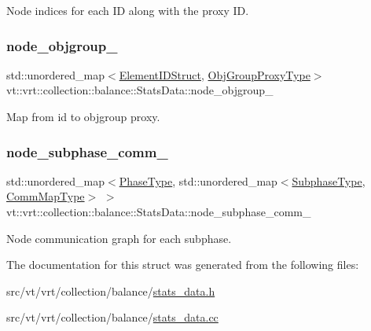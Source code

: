 Node indices for each ID along with the proxy ID. 

\mbox{\label{structvt_1_1vrt_1_1collection_1_1balance_1_1_stats_data_a1c281f52e1256426885206aa38f85670}} 
\subsubsection{\texorpdfstring{node\+\_\+objgroup\+\_\+}{node\_objgroup\_}}
{\footnotesize\ttfamily std\+::unordered\+\_\+map$<$\hyperlink{namespacevt_1_1vrt_1_1collection_1_1balance_a9f5b53fafb270212279a4757d2c4cd28}{Element\+I\+D\+Struct}, \hyperlink{namespacevt_ad7cae989df485fccca57f0792a880a8e}{Obj\+Group\+Proxy\+Type}$>$ vt\+::vrt\+::collection\+::balance\+::\+Stats\+Data\+::node\+\_\+objgroup\+\_\+}



Map from id to objgroup proxy. 

\mbox{\label{structvt_1_1vrt_1_1collection_1_1balance_1_1_stats_data_ac78802ff554a4d802a163afa5756412e}} 
\subsubsection{\texorpdfstring{node\+\_\+subphase\+\_\+comm\+\_\+}{node\_subphase\_comm\_}}
{\footnotesize\ttfamily std\+::unordered\+\_\+map$<$\hyperlink{namespacevt_a46ce6733d5cdbd735d561b7b4029f6d7}{Phase\+Type}, std\+::unordered\+\_\+map$<$\hyperlink{namespacevt_ae78cbfdf1e57470e33eedb074f2beeba}{Subphase\+Type}, \hyperlink{namespacevt_1_1vrt_1_1collection_1_1balance_a01ee1fb0ae2da1d2ab7fdca3be9ae351}{Comm\+Map\+Type}$>$ $>$ vt\+::vrt\+::collection\+::balance\+::\+Stats\+Data\+::node\+\_\+subphase\+\_\+comm\+\_\+}



Node communication graph for each subphase. 



The documentation for this struct was generated from the following files\+:\begin{DoxyCompactItemize}
\item 
src/vt/vrt/collection/balance/\hyperlink{stats__data_8h}{stats\+\_\+data.\+h}\item 
src/vt/vrt/collection/balance/\hyperlink{stats__data_8cc}{stats\+\_\+data.\+cc}\end{DoxyCompactItemize}
